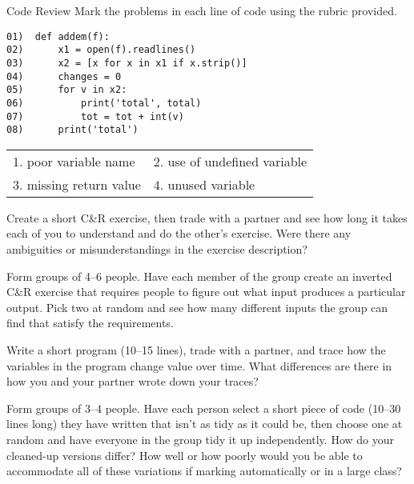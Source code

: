 \begin{aside}{Code Review}
  Mark the problems in each line of code using the rubric provided.

\begin{verbatim}
01)  def addem(f):
02)      x1 = open(f).readlines()
03)      x2 = [x for x in x1 if x.strip()]
04)      changes = 0
05)      for v in x2:
06)          print('total', total)
07)          tot = tot + int(v)
08)      print('total')
\end{verbatim}

  \begin{longtable}{ll}
    1. poor variable name   & 2. use of undefined variable \\
    3. missing return value & 4. unused variable
  \end{longtable}
\end{aside}



Create a short C\&R exercise,
then trade with a partner
and see how long it takes each of you to understand and do the other's exercise.
Were there any ambiguities or misunderstandings in the exercise description?


Form groups of 4--6 people.
Have each member of the group create an inverted C\&R exercise
that requires people to figure out what input produces a particular output.
Pick two at random
and see how many different inputs the group can find that satisfy the requirements.


Write a short program (10--15 lines),
trade with a partner,
and trace how the variables in the program change value over time.
What differences are there in how you and your partner wrote down your traces?


Form groups of 3--4 people.
Have each person select a short piece of code (10--30 lines long) they have written
that isn't as tidy as it could be,
then choose one at random and have everyone in the group tidy it up independently.
How do your cleaned-up versions differ?
How well or how poorly would you be able to accommodate all of these variations
if marking automatically or in a large class?


